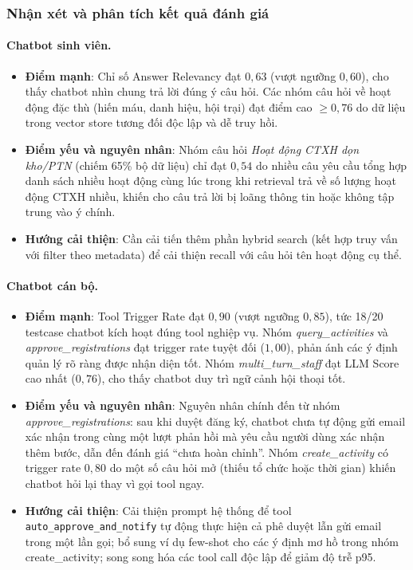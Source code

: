 \subsubsection{Nhận xét và phân tích kết quả đánh giá}

\paragraph{Chatbot sinh viên.}
\begin{itemize}
    \item \textbf{Điểm mạnh}: Chỉ số Answer Relevancy đạt $0{,}63$ (vượt ngưỡng $0{,}60$), cho thấy chatbot nhìn chung trả lời đúng ý câu hỏi. Các nhóm câu hỏi về hoạt động đặc thù (hiến máu, danh hiệu, hội trại) đạt điểm cao $\geq 0{,}76$ do dữ liệu trong vector store tương đối độc lập và dễ truy hồi.
    \item \textbf{Điểm yếu và nguyên nhân}: Nhóm câu hỏi \textit{Hoạt động CTXH dọn kho/PTN} (chiếm 65\% bộ dữ liệu) chỉ đạt $0{,}54$ do nhiều câu yêu cầu tổng hợp danh sách nhiều hoạt động cùng lúc trong khi retrieval trả về số lượng hoạt động CTXH nhiều, khiến cho câu trả lời bị loãng thông tin hoặc không tập trung vào ý chính. 
    \item \textbf{Hướng cải thiện}: Cần cải tiến thêm phần hybrid search (kết hợp truy vấn với filter theo metadata) để cải thiện recall với câu hỏi tên hoạt động cụ thể.
\end{itemize}

\paragraph{Chatbot cán bộ.}
\begin{itemize}
    \item \textbf{Điểm mạnh}: Tool Trigger Rate đạt $0{,}90$ (vượt ngưỡng $0{,}85$), tức 18/20 testcase chatbot kích hoạt đúng tool nghiệp vụ. Nhóm \textit{query\_activities} và \textit{approve\_registrations} đạt trigger rate tuyệt đối ($1{,}00$), phản ánh các ý định quản lý rõ ràng được nhận diện tốt. Nhóm \textit{multi\_turn\_staff} đạt LLM Score cao nhất ($0{,}76$), cho thấy chatbot duy trì ngữ cảnh hội thoại tốt.
    \item \textbf{Điểm yếu và nguyên nhân}: Nguyên nhân chính đến từ nhóm \textit{approve\_registrations}: sau khi duyệt đăng ký, chatbot chưa tự động gửi email xác nhận trong cùng một lượt phản hồi mà yêu cầu người dùng xác nhận thêm bước, dẫn đến đánh giá ``chưa hoàn chỉnh''. Nhóm \textit{create\_activity} có trigger rate $0{,}80$ do một số câu hỏi mở (thiếu tổ chức hoặc thời gian) khiến chatbot hỏi lại thay vì gọi tool ngay.
    \item \textbf{Hướng cải thiện}: Cải thiện prompt hệ thống để tool \texttt{auto\_approve\_and\_notify} tự động thực hiện cả phê duyệt lẫn gửi email trong một lần gọi; bổ sung ví dụ few-shot cho các ý định mơ hồ trong nhóm create\_activity; song song hóa các tool call độc lập để giảm độ trễ p95.
\end{itemize}

\clearpage
